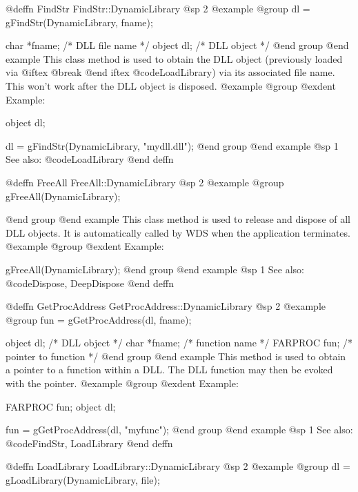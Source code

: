 @deffn {FindStr} FindStr::DynamicLibrary
@sp 2
@example
@group
dl = gFindStr(DynamicLibrary, fname);

char    *fname; /*  DLL file name  */
object  dl;     /*  DLL object     */
@end group
@end example
This class method is used to obtain the DLL object (previously loaded via
@iftex
@break 
@end iftex
@code{LoadLibrary}) via its associated file name.  This won't work
after the DLL object is disposed.
@example
@group
@exdent Example:

object  dl;

dl = gFindStr(DynamicLibrary, "mydll.dll");
@end group
@end example
@sp 1
See also:  @code{LoadLibrary}
@end deffn










@deffn {FreeAll} FreeAll::DynamicLibrary
@sp 2
@example
@group
gFreeAll(DynamicLibrary);

@end group
@end example
This class method is used to release and dispose of all DLL objects.
It is automatically called by WDS when the application terminates.
@example
@group
@exdent Example:

gFreeAll(DynamicLibrary);
@end group
@end example
@sp 1
See also:  @code{Dispose, DeepDispose}
@end deffn











@deffn {GetProcAddress} GetProcAddress::DynamicLibrary
@sp 2
@example
@group
fun = gGetProcAddress(dl, fname);

object  dl;     /*  DLL object           */
char    *fname; /*  function name        */
FARPROC fun;    /*  pointer to function  */
@end group
@end example
This method is used to obtain a pointer to a function within a
DLL.  The DLL function may then be evoked with the pointer.
@example
@group
@exdent Example:

FARPROC fun;
object  dl;

fun = gGetProcAddress(dl, "myfunc");
@end group
@end example
@sp 1
See also:  @code{FindStr, LoadLibrary}
@end deffn










@deffn {LoadLibrary} LoadLibrary::DynamicLibrary
@sp 2
@example
@group
dl = gLoadLibrary(DynamicLibrary, file);

